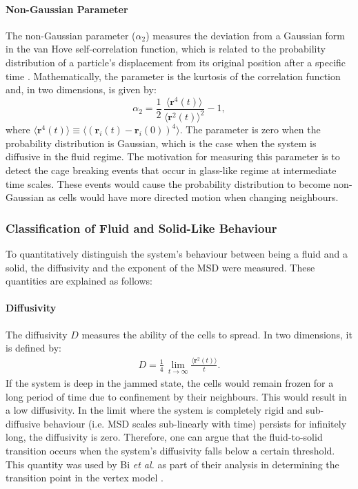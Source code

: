 \documentclass[a4paper,12pt]{article}
\begin{document}
\paragraph{Non-Gaussian Parameter}
The non-Gaussian parameter ($\alpha_2$) measures the deviation from a Gaussian form in the van Hove self-correlation function, which is related to the probability distribution of a particle's displacement from its original position after a specific time \cite{rahman1964,hofling2013}. Mathematically, the parameter is the kurtosis of the correlation function and, in two dimensions, is given by:
\begin{equation}
\alpha_2 = \frac{1}{2}\,\frac{\langle{\bm{r}^4(t)\rangle}}{\langle{\bm{r}^2(t)\rangle}^2} - 1,
\end{equation}
where $\langle{\bm{r}^4(t)\rangle} \equiv \langle{\left(\bm{r}_i(t) - \bm{r}_i(0)\right)^4\rangle}$. The parameter is zero when the probability distribution is Gaussian, which is the case when the system is diffusive in the fluid regime. The motivation for measuring this parameter is to detect the cage breaking events that occur in glass-like regime at intermediate time scales\cite{schoetz2013}. These events would cause the probability distribution to become non-Gaussian as cells would have more directed motion when changing neighbours. 

\subsubsection{Classification of Fluid and Solid-Like Behaviour}
\label{sec:fluidsolidmeasure}
To quantitatively distinguish the system's behaviour between being a fluid and a solid, the diffusivity and the exponent of the MSD were measured. These quantities are explained as follows: 

\paragraph{Diffusivity}
The diffusivity $D$ measures the ability of the cells to spread. In two dimensions, it is defined by:
 \begin{eqnarray}
D = \frac{1}{4}\, \lim_{t \rightarrow \infty} \frac{\langle{\bm{r}^2(t)\rangle}}{t}.
\end{eqnarray}
If the system is deep in the jammed state, the cells would remain frozen for a long period of time due to confinement by their neighbours. This would result in a low diffusivity. In the limit where the system is completely rigid and sub-diffusive behaviour (i.e. MSD scales sub-linearly with time) persists for infinitely long, the diffusivity is zero. Therefore, one can argue that the fluid-to-solid transition occurs when the system's diffusivity falls below a certain threshold. This quantity was used by Bi \emph{et al.} as part of their analysis in determining the transition point in the vertex model \cite{bi2015motility}.
\end{document}

